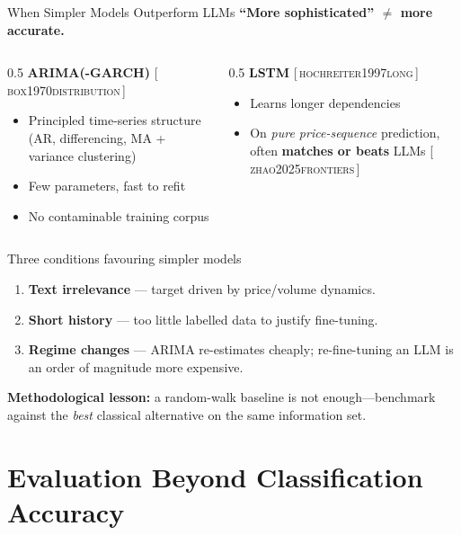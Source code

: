 \documentclass[9pt,t]{beamer}
\newcommand{\citesrc}[1]{\textsc{\small #1}}
\providecommand{\citep}[1]{{\footnotesize[\,\citesrc{#1}\,]}}
\begin{document}
\begin{frame}{When Simpler Models Outperform LLMs}
\textbf{``More sophisticated'' $\neq$ more accurate.}

\medskip
\begin{columns}[T]
\begin{column}{0.5\textwidth}
\textbf{ARIMA(-GARCH)} \citep{box1970distribution}
\begin{itemize}\footnotesize
  \item Principled time-series structure (AR, differencing, MA + variance clustering)
  \item Few parameters, fast to refit
  \item No contaminable training corpus
\end{itemize}
\end{column}
\begin{column}{0.5\textwidth}
\textbf{LSTM} \citep{hochreiter1997long}
\begin{itemize}\footnotesize
  \item Learns longer dependencies
  \item On \emph{pure price-sequence} prediction, often \textbf{matches or beats}
        LLMs \citep{zhao2025frontiers}
\end{itemize}
\end{column}
\end{columns}

\smallskip
\begin{block}{Three conditions favouring simpler models}
\begin{enumerate}\itemsep1pt
  \item \textbf{Text irrelevance} --- target driven by price/volume dynamics.
  \item \textbf{Short history} --- too little labelled data to justify fine-tuning.
  \item \textbf{Regime changes} --- ARIMA re-estimates cheaply; re-fine-tuning an
        LLM is an order of magnitude more expensive.
\end{enumerate}
\end{block}

\smallskip
\textbf{Methodological lesson:} a random-walk baseline is not enough---benchmark
against the \emph{best} classical alternative on the same information set.
\end{frame}

\section{Evaluation Beyond Classification Accuracy}
\end{document}
